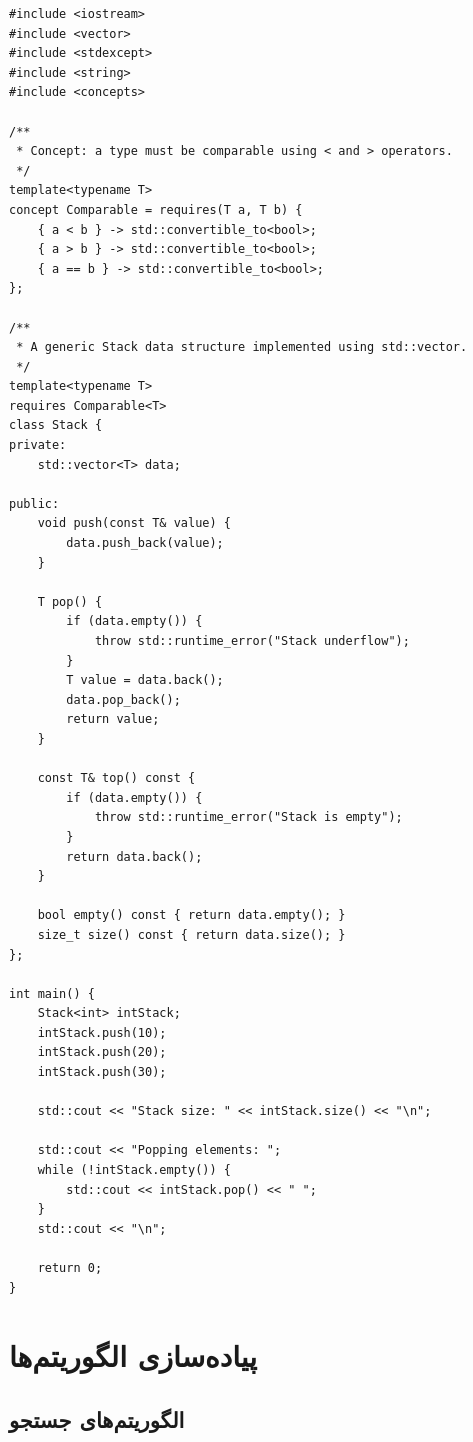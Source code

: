 \documentclass{matinbook}
\begin{document}
\begin{latin}
\begin{verbatim}
#include <iostream>
#include <vector>
#include <stdexcept>
#include <string>
#include <concepts>

/**
 * Concept: a type must be comparable using < and > operators.
 */
template<typename T>
concept Comparable = requires(T a, T b) {
    { a < b } -> std::convertible_to<bool>;
    { a > b } -> std::convertible_to<bool>;
    { a == b } -> std::convertible_to<bool>;
};

/**
 * A generic Stack data structure implemented using std::vector.
 */
template<typename T>
requires Comparable<T>
class Stack {
private:
    std::vector<T> data;

public:
    void push(const T& value) {
        data.push_back(value);
    }

    T pop() {
        if (data.empty()) {
            throw std::runtime_error("Stack underflow");
        }
        T value = data.back();
        data.pop_back();
        return value;
    }

    const T& top() const {
        if (data.empty()) {
            throw std::runtime_error("Stack is empty");
        }
        return data.back();
    }

    bool empty() const { return data.empty(); }
    size_t size() const { return data.size(); }
};

int main() {
    Stack<int> intStack;
    intStack.push(10);
    intStack.push(20);
    intStack.push(30);

    std::cout << "Stack size: " << intStack.size() << "\n";

    std::cout << "Popping elements: ";
    while (!intStack.empty()) {
        std::cout << intStack.pop() << " ";
    }
    std::cout << "\n";

    return 0;
}
\end{verbatim}
\end{latin}
\label{code:templates}

\chapter{پیاده‌سازی الگوریتم‌ها}
\label{chap:algorithms}

\section{الگوریتم‌های جستجو}
\label{sec:algorithms-search}
\end{document}
